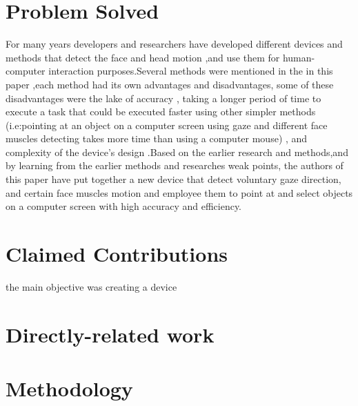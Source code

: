 \documentclass[a4paper]{article}
\begin{document}
\section{Problem Solved}
For many years developers and researchers have developed different devices and methods that detect the face and head motion ,and use them for human-computer interaction purposes.Several methods were mentioned in the in this paper ,each method had its own advantages and disadvantages, some of these disadvantages were the lake of accuracy , taking a longer period of time to execute a task that could be executed faster using other simpler methods (i.e:pointing at an object on a computer screen using gaze and different face muscles detecting takes more time than using a computer mouse) , and complexity of the device's design   .Based on the earlier research and methods,and by learning from the earlier methods and researches weak points, the authors of this paper have put together a new device that detect voluntary gaze direction, and certain face muscles motion and employee them to point at and select objects on a computer screen with high accuracy and efficiency.

\section{Claimed Contributions}
the main objective was creating a device 
 


\section{Directly-related work} 

\section{Methodology}
	
\end{document}
